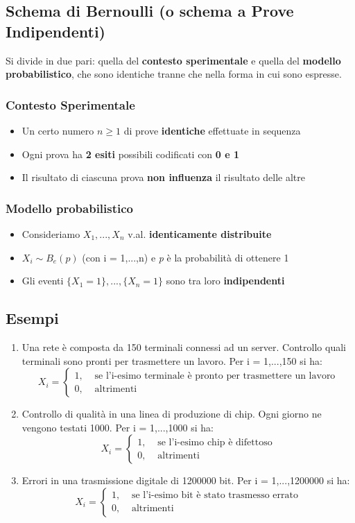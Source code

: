 \documentclass{report}
\begin{document}
\subsection{Schema di Bernoulli (o schema a Prove Indipendenti)}
Si divide in due pari: quella del \textbf{contesto sperimentale} e quella del \textbf{modello probabilistico}, che sono identiche tranne che nella forma in cui sono espresse.
\subsubsection{Contesto Sperimentale}
\begin{itemize}
    \item Un certo numero \(n \geq 1\) di prove \textbf{identiche} effettuate in sequenza
    \item Ogni prova ha \textbf{2 esiti} possibili codificati con \textbf{0 e 1}
    \item Il risultato di ciascuna prova \textbf{non influenza} il risultato delle altre
\end{itemize}
\subsubsection{Modello probabilistico}
\begin{itemize}
    \item Consideriamo \(X_1,...,X_n\) v.al. \textbf{identicamente distribuite}
    \item \(X_i \sim B_e(p)\) (con i = 1,...,n) e \textit{p} è la probabilità di ottenere 1
    \item Gli eventi \(\{X_1 = 1\},..., \{X_n = 1\}\) sono tra loro \textbf{indipendenti}
\end{itemize}
\subsection{Esempi}
\begin{enumerate}
    \item Una rete è composta da 150 terminali connessi ad un server. Controllo quali terminali sono pronti per trasmettere un lavoro. Per i = 1,...,150 si ha: \[X_i = 
    \begin{cases}
    1, & \text{ se l'i-esimo terminale è pronto per trasmettere un lavoro}\\
    0, & \text{ altrimenti}
    \end{cases}\]
    \item Controllo di qualità in una linea di produzione di chip. Ogni giorno ne vengono testati 1000. Per i = 1,...,1000 si ha: \[X_i =
    \begin{cases}
    1, & \text{ se l'i-esimo chip è difettoso}\\
    0, & \text{ altrimenti}
    \end{cases}\]
    \item Errori in una trasmissione digitale di 1200000 bit. Per i = 1,...,1200000 si ha: \[X_i = 
    \begin{cases}
    1, & \text{ se l'i-esimo bit è stato trasmesso errato}\\
    0, & \text{ altrimenti}
    \end{cases}\]
\end{enumerate}
\end{document}
